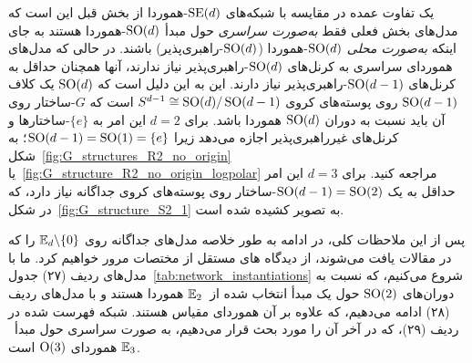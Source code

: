 یک تفاوت عمده در مقایسه با شبکه‌های $\operatorname{SE}(d)$-هموردا از بخش قبل این است که مدل‌های بخش فعلی فقط \emph{به‌صورت سراسری} حول مبدأ $\operatorname{SO}(d)$-هموردا هستند به جای اینکه \emph{به‌صورت محلی} $\operatorname{SO}(d)$-هموردا ($\operatorname{SO}(d)$-راهبری‌پذیر) باشند.
در حالی که مدل‌های هموردای سراسری به کرنل‌های $\operatorname{SO}(d)$-راهبری‌پذیر نیاز ندارند، آنها همچنان حداقل به کرنل‌های $\operatorname{SO}(d-1)$-راهبری‌پذیر نیاز دارند.
این به این دلیل است که $\operatorname{SO}(d)$ یک کلاف $\operatorname{SO}(d-1)$ روی پوسته‌های کروی $S^{d-1} \cong \operatorname{SO}(d)/\operatorname{SO}(d-1)$ است که $G$-ساختار روی آن باید نسبت به دوران $\operatorname{SO}(d)$ هموردا باشد.
برای $d=2$ این امر به $\{e\}$-ساختارها و کرنل‌های غیرراهبری‌پذیر اجازه می‌دهد زیرا $\operatorname{SO}(d-1) = \operatorname{SO}(1) = \{e\}$؛ به شکل~\ref{fig:G_structures_R2_no_origin} یا~\ref{fig:G_structure_R2_no_origin_logpolar} مراجعه کنید.
برای $d=3$ این امر حداقل به یک $\operatorname{SO}(d-1) = \operatorname{SO}(2)$-ساختار روی پوسته‌های کروی جداگانه نیاز دارد، که در شکل~\ref{fig:G_structure_S2_1} به تصویر کشیده شده است.


پس از این ملاحظات کلی، در ادامه به طور خلاصه مدل‌های جداگانه روی $\mathbb{E}_d \backslash \{0\}$ را که در مقالات یافت می‌شوند، از دیدگاه های مستقل از مختصات مرور خواهیم کرد.
ما با مدل‌های ردیف (۲۷) جدول~\ref{tab:network_instantiations} شروع می‌کنیم، که نسبت به دوران‌های $\operatorname{SO}(2)$ حول یک مبدأ انتخاب شده از~$\mathbb{E}_2$ هموردا هستند و با مدل‌های ردیف (۲۸) ادامه می‌دهیم، که علاوه بر آن هموردای مقیاس هستند.
شبکه فهرست شده در ردیف (۲۹)، که در آخر آن را مورد بحث قرار می‌دهیم، به صورت سراسری حول مبدأ~$\mathbb{E}_3$ هموردای $\operatorname{O}(3)$ است.